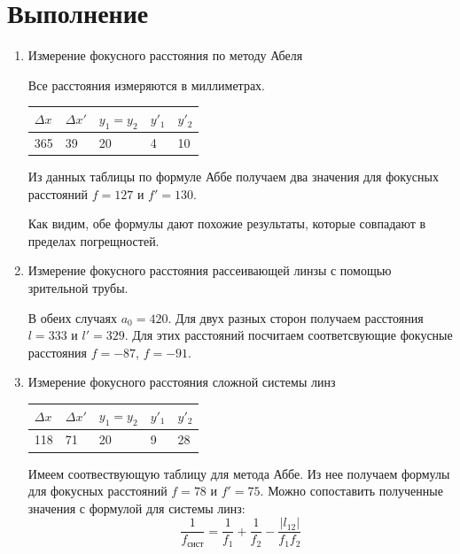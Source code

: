 \documentclass[a4paper,12pt]{article}
\theoremstyle{plain} %
\theoremstyle{definition} %
\theoremstyle{remark} %
\begin{document}
 
 
 
\section{Выполнение}
\begin{enumerate}
   \item Измерение фокусного расстояния по методу Абеля


Все расстояния измеряются в миллиметрах.
\begin{table}[h!]
	\begin{center}
	\begin{tabular}{|l|l|l|l|l|}
		\hline
		$\Delta{}x$&$\Delta{}x'$	& $y_1 = y_2$  & $y'_1$ & $y'_2$  \\ \hline
		365& 39 & 20 & 4 & 10 \\ \hline
	\end{tabular}
\end{center}
\end{table} 


Из данных таблицы по формуле Аббе получаем два значения для фокусных расстояний $f=127$ и $f'=130$.

Как видим, обе формулы дают похожие результаты, которые совпадают в пределах погрещностей.

\item Измерение фокусного расстояния рассеивающей линзы с помощью зрительной трубы.

В обеих случаях $a_0 = 420$. Для двух разных сторон получаем расстояния $l = 333$ и $l' = 329$. Для этих расстояний посчитаем соответсвующие фокусные расстояния $f = -87$, $f = - 91$.

\item Измерение фокусного расстояния сложной системы линз

\begin{table}[h!]
	\begin{center}
		\begin{tabular}{|l|l|l|l|l|}
			\hline
			$\Delta{}x$&$\Delta{}x'$	& $y_1 = y_2$  & $y'_1$ & $y'_2$  \\ \hline
			118& 71 & 20 & 9 & 28 \\ \hline
		\end{tabular}
	\end{center}
\end{table} 

Имеем соотвествующую таблицу для метода Аббе. Из нее получаем формулы для фокусных расстояний $f=78$ и $f'=75$. Можно сопоставить полученные значения с формулой для системы линз:
\[ \frac{1}{f_\text{сист}} = \frac{1}{f_1} + \frac{1}{f_2} - \frac{|l_{12}|}{f_1f_2}           \]


\end{enumerate}
\end{document}
